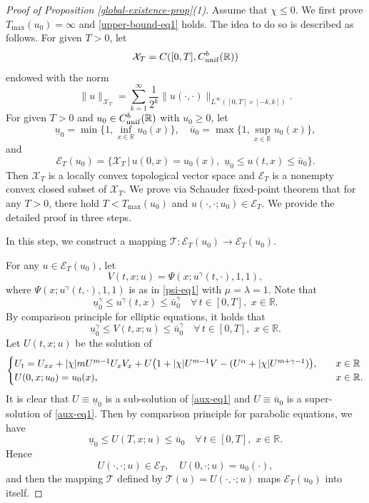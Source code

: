 \documentclass[11pt]{article} %
\theoremstyle{remark}
\theoremstyle{remark}
\numberwithin{equation}{section}
\numberwithin{figure}{section}
\numberwithin{table}{section}
\newcommand\RR{\ensuremath{\mathbb{R}}}
\begin{document}
\begin{proof} [Proof of Proposition \ref{global-existence-prop}(1)]
 Assume that   $\chi\le 0$.   We first prove $T_{\max}(u_0)=\infty$ and \eqref{upper-bound-eq1} holds. 
The idea to do so is  described 
as follows. For given $T>0$, let
$$
\mathcal{X}_T=C([0,T],C_{\rm unif}^b(\RR))
$$
endowed with the norm
$$
\|u\|_{\mathcal{X}_T}=\sum_{k=1}^\infty\frac{1}{2^k}\|u(\cdot,\cdot)\|_{L^\infty([0,T]\times [-k,k])}.
$$
For  given $T>0$ and $u_0\in C_{\rm unif}^b(\RR)$ with $u_0\ge 0$, let
$$
\underline u_0=\min\{1,\inf_{x\in\RR}u_0(x)\},\quad \bar u_0=\max\{1,\sup_{x\in\RR}u_0(x)\},
$$
and
$$
\mathcal{E}_T(u_0)=\{ \mathcal{X}_T\,|\, u(0,x)=u_0(x),\,\,   \underline u_0\le u(t,x)\le\bar u_0\}.
$$
Then $\mathcal{X}_T$ is a locally convex topological vector space and  $\mathcal{E}_T$ is a nonempty convex closed  subset of $\mathcal{X}_T$.
We prove via 
 Schauder fixed-point theorem that for any $T>0$,  there hold $T<T_{\max}(u_0)$ and $u(\cdot,\cdot;u_0)\in \mathcal{E}_T$.  We provide the detailed proof in three steps.

\smallskip

 In this step, we construct a mapping $\mathcal{T}:\mathcal{E}_T(u_0)\to \mathcal{E}_T(u_0)$.

\smallskip

For any $u\in \mathcal{E}_T(u_0)$, let 
$$
V(t,x;u)=\Psi(x;u^\gamma(t,\cdot),1,1),
$$
where $\Psi(x;u^\gamma(t,\cdot),1,1)$ is as in \eqref{psi-eq1} with $\mu=\lambda=1$.  Note that
$$
\underline u_0^\gamma\le u^\gamma(t,x)\le \bar u_0^\gamma\quad \forall\, t\in [0,T],\,\, x\in\mathbb{R}.
$$
By comparison principle for elliptic equations, it holds that
$$
\underline u_0^\gamma\le V(t,x;u)\le \bar u_0^\gamma\quad \forall\, t\in [0,T],\,\, x\in\mathbb{R}.
$$
 Let
$U(t,x;u)$ be the solution of
\begin{equation}
\label{aux-eq1}
\begin{cases}
U_t=U_{xx}+|\chi|m U^{m-1} U_x V_x +U\big(1+|\chi| U^{m-1} V - (U^\alpha +|\chi|U^{m+\gamma -1})\big),\quad &x\in\RR\cr
U(0,x;u_0)=u_0(x),\quad &x\in\RR.
\end{cases}
\end{equation}
It is clear that $U\equiv \underline u_0$ is a sub-solution of \eqref{aux-eq1} and $U\equiv \bar u_0$ is a super-solution of \eqref{aux-eq1}.
Then by comparison principle for parabolic equations, we have
$$
\underline u_0\le U(T,x;u)\le\bar u_0\quad \forall\, t\in [0,T],\,\, x\in\mathbb{R}.
$$
Hence
$$
U(\cdot,\cdot;u)\in \mathcal{E}_T,\quad U(0,\cdot;u)=u_0(\cdot),
$$
and then the mapping  $\mathcal{T}$ defined by 
$\mathcal{T}(u)=U(\cdot,\cdot;u)$ maps 
$\mathcal{E}_T(u_0)$ into itself.




\end{proof}
\end{document}
